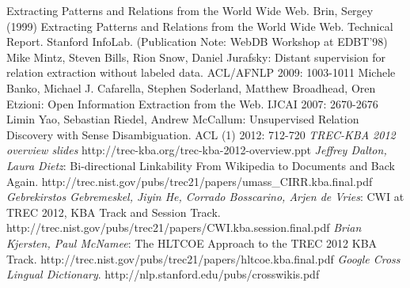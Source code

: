 \begin{thebibliography}{1}
 Extracting Patterns and Relations from the World Wide Web. Brin, Sergey (1999) Extracting Patterns and Relations from the World Wide Web. Technical Report. Stanford InfoLab. (Publication Note: WebDB Workshop at EDBT'98)
 Mike Mintz, Steven Bills, Rion Snow, Daniel Jurafsky: Distant supervision for relation extraction without labeled data. ACL/AFNLP 2009: 1003-1011   
 Michele Banko, Michael J. Cafarella, Stephen Soderland, Matthew Broadhead, Oren Etzioni: Open Information Extraction from the Web. IJCAI 2007: 2670-2676
 Limin Yao, Sebastian Riedel, Andrew McCallum: Unsupervised Relation Discovery with Sense Disambiguation. ACL (1) 2012: 712-720  
 {\em TREC-KBA 2012 overview slides} http://trec-kba.org/trec-kba-2012-overview.ppt
 {\em Jeffrey Dalton, Laura Dietz}: Bi-directional Linkability From Wikipedia to Documents and Back Again. http://trec.nist.gov/pubs/trec21/papers/umass\_CIRR.kba.final.pdf
 {\em Gebrekirstos Gebremeskel, Jiyin He, Corrado Bosscarino, Arjen de Vries}: CWI at TREC 2012, KBA Track and Session Track. http://trec.nist.gov/pubs/trec21/papers/CWI.kba.session.final.pdf
 {\em Brian Kjersten, Paul McNamee}: The HLTCOE Approach to the TREC 2012 KBA Track. http://trec.nist.gov/pubs/trec21/papers/hltcoe.kba.final.pdf
 {\em Google Cross Lingual Dictionary}. http://nlp.stanford.edu/pubs/crosswikis.pdf
\end{thebibliography}
